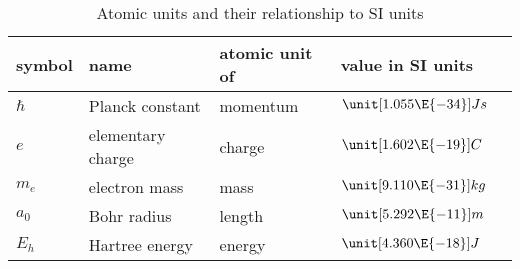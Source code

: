 \begin{table}
	\centering
	\begin{tabular}{lllll}
		\toprule
		symbol & name & atomic unit of & value in SI units \\
		\midrule
		$\hbar$ & Planck constant & momentum & $\unit[1.055\E{-34}]{Js}$ \\
		$e$ & elementary charge & charge & $\unit[1.602\E{-19}]{C}$ \\
		$m_e$ & electron mass & mass & $\unit[9.110\E{-31}]{kg}$ \\
		$a_0$ & Bohr radius & length & $\unit[5.292\E{-11}]{m}$ \\
		$E_h$ & Hartree energy & energy & $\unit[4.360\E{-18}]{J}$ \\
		\bottomrule
	\end{tabular}
	\caption{Atomic units and their relationship to SI units}
	\label{tab:AtomicUnits}
\end{table}
